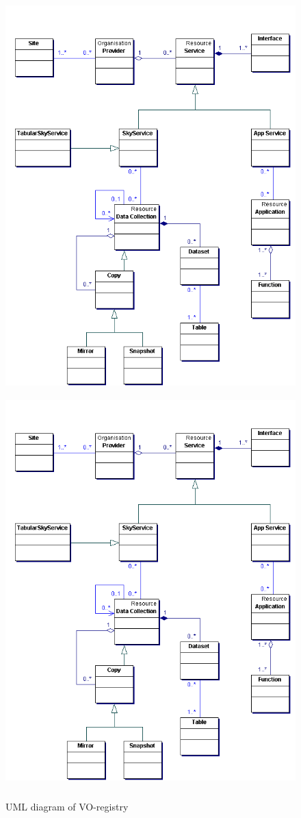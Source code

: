     \begin{figure}[!htbp]
      \begin{center}
        \leavevmode
        \ifpdf
        \includegraphics[height=15cm]{registry}
        \else
        \includegraphics[bb = 92 86 545 742, height=6in]{registry}
        \fi
        \caption{UML diagram of VO-registry}
        \label{FigAir}
      \end{center}
    \end{figure}



